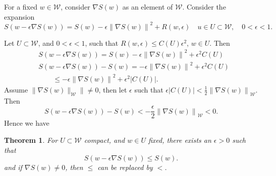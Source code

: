 \documentclass[10pt, a4paper]{article}
\theoremstyle{plain}
\newtheorem{theorem}{Theorem}[section]
\theoremstyle{definition}
\theoremstyle{definition}
\theoremstyle{definition}
\theoremstyle{definition}
\theoremstyle{definition}
\theoremstyle{definition}
\theoremstyle{definition}
\theoremstyle{remark}
\theoremstyle{remark}
\theoremstyle{rudin-style-generic}
\theoremstyle{rudin-style-generic*}
\theoremstyle{rudin-style-theorem}
\begin{document}
For a fixed $w\in\mathcal W$, consider $\nabla S(w)$ as an element of $\mathcal W$.
Consider the expansion
$$
S(w-\epsilon\nabla S(w)) = S(w) - \epsilon {\|\nabla S(w)\|}^2 + R(w,\epsilon)
\quad u\in U\subset\mathcal W,\quad 0<\epsilon<1
.
$$

Let
$U \subset \mathcal W$, and $0<\epsilon<1$, such that  $R(w, \epsilon) \le C(U) \epsilon^2$, $w\in U$.
Then
\begin{align*}
	&S(w - \epsilon \nabla S(w) ) = S(w) - \epsilon {\| \nabla S(w) \|}^2  + \epsilon^2 C(U)\\
	&S(w - \epsilon \nabla S(w) )  - S(w)  = -\epsilon {\| \nabla S(w) \|}^2+ \epsilon^2 C(U)\\
	&\qquad \le -\epsilon  {\| \nabla S(w) \|}^2 + \epsilon^2 |C(U)|
	.
\end{align*}
Assume $\|\nabla S(w)\|_{\mathcal W}\| \ne 0$, then
let $\epsilon$ such that $\epsilon|C(U)| < \frac12 {\|\nabla S(w)\|}_{\mathcal W}$.
Then 
\begin{equation*}
	S(w - \epsilon \nabla S(w) )  - S(w) < -\frac{\epsilon}{2} {\|\nabla S(w)\|}_{\mathcal W} < 0
		.
\end{equation*}
Hence we have
\begin{theorem}
	For $U\subset\mathcal W$ compact, and $w\in U$ fixed,
	there exists an $\epsilon>0$ such that
	$$
	S(w-\epsilon\nabla S(w)) \le S(w)
	.
	$$
	and if $\nabla S(w)\ne 0$, then $\le$ can be replaced by $<$. 
\end{theorem}
\end{document}
